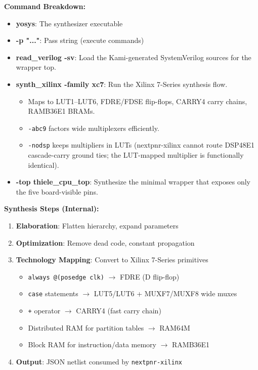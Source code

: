 \textbf{Command Breakdown:}
\begin{itemize}
    \item \textbf{yosys}: The synthesizer executable
    \item \textbf{-p "..."}: Pass string (execute commands)
    \item \textbf{read\_verilog -sv}: Load the Kami-generated SystemVerilog
      sources for the wrapper top.
    \item \textbf{synth\_xilinx -family xc7}: Run the Xilinx 7-Series synthesis flow.
    \begin{itemize}
        \item Maps to LUT1--LUT6, FDRE/FDSE flip-flops, CARRY4 carry chains, RAMB36E1 BRAMs.
        \item \texttt{-abc9} factors wide multiplexers efficiently.
        \item \texttt{-nodsp} keeps multipliers in LUTs (nextpnr-xilinx
              cannot route DSP48E1 cascade-carry ground ties; the
              LUT-mapped multiplier is functionally identical).
    \end{itemize}
    \item \textbf{-top thiele\_cpu\_top}: Synthesize the minimal wrapper that
      exposes only the five board-visible pins.
\end{itemize}

\textbf{Synthesis Steps (Internal):}
\begin{enumerate}
    \item \textbf{Elaboration}: Flatten hierarchy, expand parameters
    \item \textbf{Optimization}: Remove dead code, constant propagation
    \item \textbf{Technology Mapping}: Convert to Xilinx 7-Series primitives
    \begin{itemize}
        \item \texttt{always @(posedge clk)} $\rightarrow$ FDRE (D flip-flop)
        \item \texttt{case} statements $\rightarrow$ LUT5/LUT6 + MUXF7/MUXF8 wide muxes
        \item \texttt{+} operator $\rightarrow$ CARRY4 (fast carry chain)
        \item Distributed RAM for partition tables $\rightarrow$ RAM64M
        \item Block RAM for instruction/data memory $\rightarrow$ RAMB36E1
    \end{itemize}
    \item \textbf{Output}: JSON netlist consumed by \texttt{nextpnr-xilinx}
\end{enumerate}


